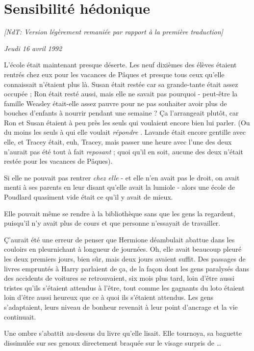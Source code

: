 
\chapter{Sensibilité hédonique}

\emph{[NdT: Version légèrement remaniée par rapport à la première traduction]} 

\emph{Jeudi 16 avril 1992} 

L'école était maintenant presque déserte. Les neuf dixièmes des élèves étaient rentrés chez eux pour les vacances de Pâques et presque tous ceux qu'elle connaissait n'étaient plus là. Susan était restée car sa grande-tante était assez occupée ; Ron était resté aussi, mais elle ne savait pas pourquoi - peut-être la famille Weasley était-elle assez pauvre pour ne pas souhaiter avoir plus de bouches d'enfants à nourrir pendant une semaine ? Ça l'arrangeait plutôt, car Ron et Susan étaient à peu près les seuls qui voulaient encore bien lui parler. (Ou du moins les seuls à qui elle voulait \emph{répondre} . Lavande était encore gentille avec elle, et Tracey était, euh, Tracey, mais passer une heure avec l'une des deux n'aurait pas été tout à fait \emph{reposant}  ; quoi qu'il en soit, aucune des deux n'était restée pour les vacances de Pâques).

Si elle ne pouvait pas rentrer \emph{chez elle}  - et elle n'en avait pas le droit, on avait menti à ses parents en leur disant qu'elle avait la lumiole - alors une école de Poudlard quasiment vide était ce qu'il y avait de mieux.

Elle pouvait même se rendre à la bibliothèque sans que les gens la regardent, puisqu'il n'y avait plus de cours et que personne n'essayait de travailler.

Ç'aurait été une erreur de penser que Hermione déambulait abattue dans les couloirs en pleurnichant à longueur de journées. Oh, elle avait beaucoup pleuré les deux premiers jours, bien sûr, mais deux jours avaient suffit. Des passages de livres empruntés à Harry parlaient de ça, de la façon dont les gens paralysés dans des accidents de voitures se retrouvaient, six mois plus tard, loin d'être aussi tristes qu'ils s'étaient attendus à l'être, tout comme les gagnants du loto étaient loin d'être aussi heureux que ce à quoi ils s'étaient attendus. Les gens s'adaptaient, leurs niveau de bonheur revenait à leur point d'ancrage et la vie continuait.

Une ombre s'abattit au-dessus du livre qu'elle lisait. Elle tournoya, sa baguette dissimulée sur ses genoux directement braquée sur le visage surpris de …

